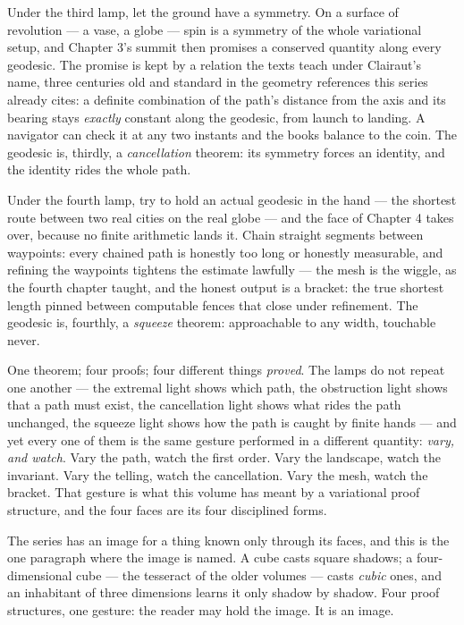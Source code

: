 Under the third lamp, let the ground have a symmetry. On a surface of
revolution --- a vase, a globe --- spin is a symmetry of the whole
variational setup, and Chapter 3's summit then promises a conserved
quantity along every geodesic. The promise is kept by a relation the
texts teach under Clairaut's name, three centuries old and standard in
the geometry references this series already cites: a definite
combination of the path's distance from the axis and its bearing stays
\emph{exactly} constant along the geodesic, from launch to landing. A
navigator can check it at any two instants and the books balance to the
coin. The geodesic is, thirdly, a \emph{cancellation} theorem: its
symmetry forces an identity, and the identity rides the whole path.

Under the fourth lamp, try to hold an actual geodesic in the hand ---
the shortest route between two real cities on the real globe --- and the
face of Chapter 4 takes over, because no finite arithmetic lands it.
Chain straight segments between waypoints: every chained path is
honestly too long or honestly measurable, and refining the waypoints
tightens the estimate lawfully --- the mesh is the wiggle, as the fourth
chapter taught, and the honest output is a bracket: the true shortest
length pinned between computable fences that close under refinement.
The geodesic is, fourthly, a \emph{squeeze} theorem: approachable to any
width, touchable never.

One theorem; four proofs; four different things \emph{proved}. The lamps
do not repeat one another --- the extremal light shows which path, the
obstruction light shows that a path must exist, the cancellation light
shows what rides the path unchanged, the squeeze light shows how the
path is caught by finite hands --- and yet every one of them is the
same gesture performed in a different quantity: \emph{vary, and watch}.
Vary the path, watch the first order. Vary the landscape, watch the
invariant. Vary the telling, watch the cancellation. Vary the mesh,
watch the bracket. That gesture is what this volume has meant by a
variational proof structure, and the four faces are its four
disciplined forms.

\begin{intuition}
The series has an image for a thing known only through its faces, and
this is the one paragraph where the image is named. A cube casts square
shadows; a four-dimensional cube --- the tesseract of the older volumes
--- casts \emph{cubic} ones, and an inhabitant of three dimensions
learns it only shadow by shadow. Four proof structures, one gesture:
the reader may hold the image. It is an image.
\end{intuition}


